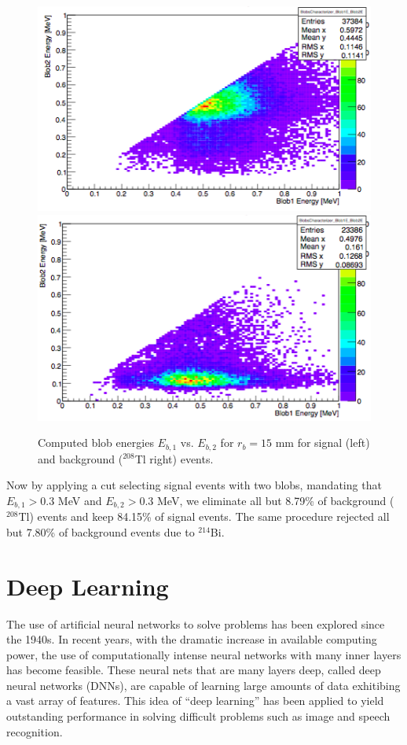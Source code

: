 \documentclass[a4paper,11pt]{article}
\begin{document}
\begin{figure}[!htb]
	\centering
	\includegraphics[scale = 0.45]{fig/blobcuts_bb0nu_2x2x2_E1vsE2.png}
	\includegraphics[scale = 0.45]{fig/blobcuts_Tl208_2x2x2_E1vsE2.png}
	\caption{Computed blob energies $E_{b,1}$ vs. $E_{b,2}$ for $r_b = 15$ mm for signal (left) and background ($^{208}$Tl right) events.} \label{fig.blobcuts}
\end{figure}

Now by applying a cut selecting signal events with two blobs, mandating that $E_{b,1} > 0.3$ MeV and $E_{b,2} > 0.3$ MeV, we eliminate all but 8.79\% of background ($^{208}$Tl) events 
and keep 84.15\% of signal events.  The same procedure rejected all but 7.80\% of background events due to $^{214}$Bi.

\section{Deep Learning}
The use of artificial neural networks to solve problems has been explored since the 1940s.  In recent years, with the dramatic increase in available computing power, the use of computationally
intense neural networks with many inner layers has become feasible.  These neural nets that are many layers deep, called deep neural networks (DNNs), are capable of learning large
amounts of data exhitibing a vast array of features.  This idea of ``deep learning'' has been applied to yield outstanding performance in solving difficult problems such as image and 
speech recognition.
\end{document}

